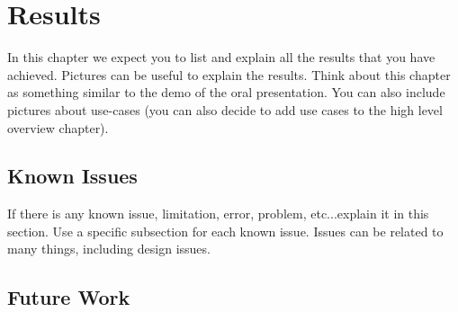 \chapter{Results}
In this chapter we expect you to list and explain all the results that you have achieved. Pictures can be useful to explain the results. Think about this chapter as something similar to the demo of the oral presentation. You can also include pictures about use-cases (you can also decide to add use cases to the high level overview chapter).
\section{Known Issues}
If there is any known issue, limitation, error, problem, etc...explain it in this section. Use a specific subsection for each known issue. Issues can be related to many things, including design issues.
\section{Future Work}
\label{sec:future_work}

